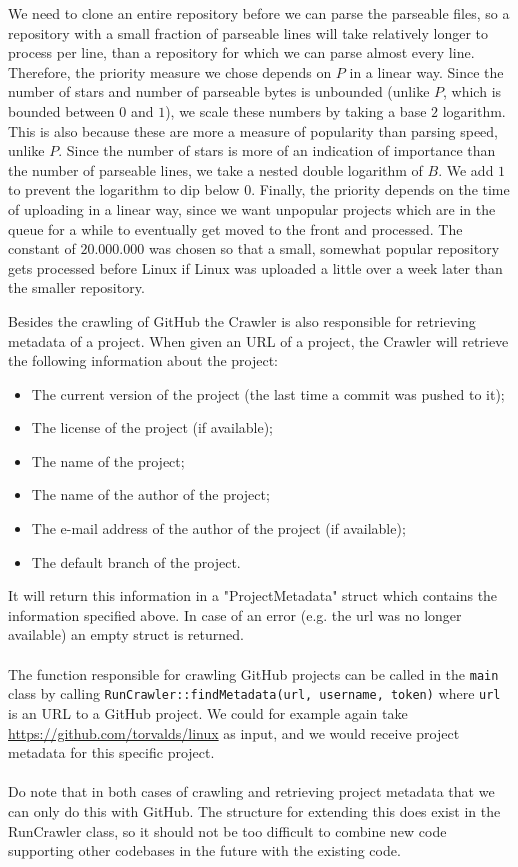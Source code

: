 \documentclass[../Main.tex]{subfiles}
\begin{document}
We need to clone an entire repository before we can parse the parseable files, so a repository with a small fraction of parseable lines will take relatively longer to process per line, than a repository for which we can parse almost every line. Therefore, the priority measure we chose depends on $P$ in a linear way. Since the number of stars and number of parseable bytes is unbounded (unlike $P$, which is bounded between $0$ and $1$), we scale these numbers by taking a base $2$ logarithm. This is also because these are more a measure of popularity than parsing speed, unlike $P$. Since the number of stars is more of an indication of importance than the number of parseable lines, we take a nested double logarithm of $B$. We add $1$ to prevent the logarithm to dip below $0$. Finally, the priority depends on the time of uploading in a linear way, since we want unpopular projects which are in the queue for a while to eventually get moved to the front and processed. The constant of $20.000.000$ was chosen so that a small, somewhat popular repository gets processed before Linux if Linux was uploaded a little over a week later than the smaller repository.

Besides the crawling of GitHub the Crawler is also responsible for retrieving metadata of a project. When given an URL of a project, the Crawler will retrieve the following information about the project:
\begin{itemize}
    \item The current version of the project (the last time a commit was pushed to it);
    \item The license of the project (if available);
    \item The name of the project;
    \item The name of the author of the project;
    \item The e-mail address of the author of the project (if available);
    \item The default branch of the project.
\end{itemize}
It will return this information in a "ProjectMetadata" struct which contains the information specified above. In case of an error (e.g. the url was no longer available) an empty struct is returned.
~\\
~\\
The function responsible for crawling GitHub projects can be called in the \texttt{main} class by calling \texttt{RunCrawler::findMetadata(url, username, token)}
where \texttt{url} is an URL to a GitHub project. We could for example again take \url{https://github.com/torvalds/linux} as input, and we would receive project metadata for this specific project.
~\\
~\\
Do note that in both cases of crawling and retrieving project metadata that we can only do this with GitHub. The structure for extending this does exist in the RunCrawler class, so it should not be too difficult to combine new code supporting other codebases in the future with the existing code.
\end{document}
